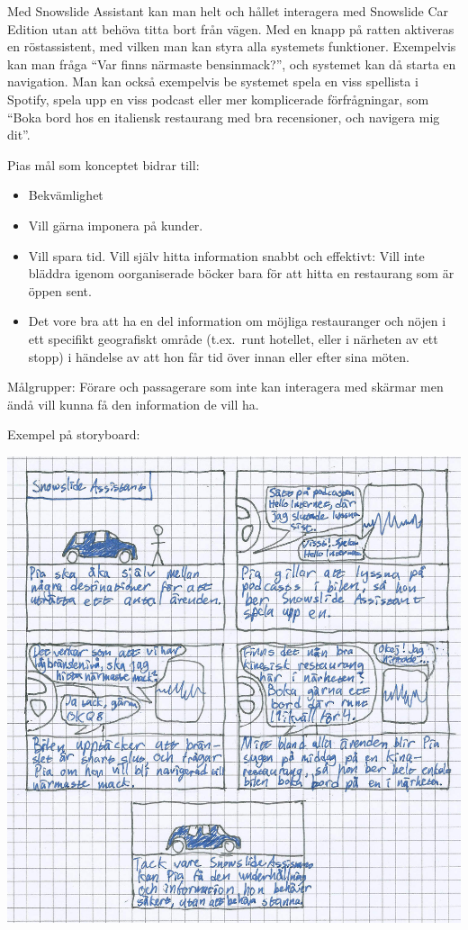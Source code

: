 \documentclass[a4paper,12pt,titlepage]{article}
\begin{document}
Med Snowslide Assistant kan man helt och hållet interagera med Snowslide Car
Edition utan att behöva titta bort från vägen. Med en knapp på ratten aktiveras
en röstassistent, med vilken man kan styra alla systemets funktioner.
Exempelvis kan man fråga ``Var finns närmaste bensinmack?'', och systemet kan då
starta en navigation. Man kan också exempelvis be systemet spela en viss spellista i Spotify,
spela upp en viss podcast eller mer komplicerade förfrågningar, som ``Boka bord
hos en italiensk restaurang med bra recensioner, och navigera mig dit''.

Pias mål som konceptet bidrar till:
\begin{itemize}
    \item Bekvämlighet
    \item Vill gärna imponera på kunder.
    \item Vill spara tid. Vill själv hitta
        information snabbt och effektivt: Vill
        inte bläddra igenom oorganiserade
        böcker bara för att hitta en restaurang
        som är öppen sent.
    \item Det vore bra att ha en del
        information om möjliga restauranger
        och nöjen i ett specifikt geografiskt
        område (t.ex.\ runt hotellet, eller i
        närheten av ett stopp) i händelse av
        att hon får tid över innan eller efter
        sina möten. 
\end{itemize}

Målgrupper: Förare och passagerare som inte kan interagera med skärmar men ändå
vill kunna få den information de vill ha.

\newpage
Exempel på storyboard:

\begin{center}
\includegraphics[width=15cm]{images/assistant.jpg}
\end{center}
\end{document}
